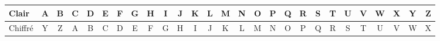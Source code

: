
\begin{tabular}{l|c|c|c|c|c|c|c|c|c|c|c|c|c|c|c|c|c|c|c|c|c|c|c|c|c|c}
Clair	&A	&B	&C	&D	&E	&F	&G	&H	&I	&J	&K	&L	&M	&N	&O	&P	&Q	&R	&S	&T	&U	&V	&W	&X	&Y	&Z\\
\hline
Chiffré	&Y	&Z	&A	&B	&C	&D	&E	&F	&G	&H	&I	&J	&K	&L	&M	&N	&O	&P	&Q	&R	&S	&T	&U	&V	&W	&X\\

\end{tabular}
